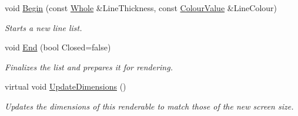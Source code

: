 \begin{DoxyCompactItemize}
void \hyperlink{classMezzanine_1_1UI_1_1LineList_ae5a45cc87def03c379665c6c5ec06f83}{Begin} (const \hyperlink{namespaceMezzanine_adcbb6ce6d1eb4379d109e51171e2e493}{Whole} \&LineThickness, const \hyperlink{classMezzanine_1_1ColourValue}{ColourValue} \&LineColour)
\begin{DoxyCompactList}\small\item\em Starts a new line list. \item\end{DoxyCompactList}\item 
void \hyperlink{classMezzanine_1_1UI_1_1LineList_aa216a1f529f4e8664ec2d6877f4c9cf5}{End} (bool Closed=false)
\begin{DoxyCompactList}\small\item\em Finalizes the list and prepares it for rendering. \item\end{DoxyCompactList}\item 
virtual void \hyperlink{classMezzanine_1_1UI_1_1LineList_a25e792075ec0c5165d5870d8e0710b7f}{UpdateDimensions} ()
\begin{DoxyCompactList}\small\item\em Updates the dimensions of this renderable to match those of the new screen size. \item\end{DoxyCompactList}\end{DoxyCompactItemize}
